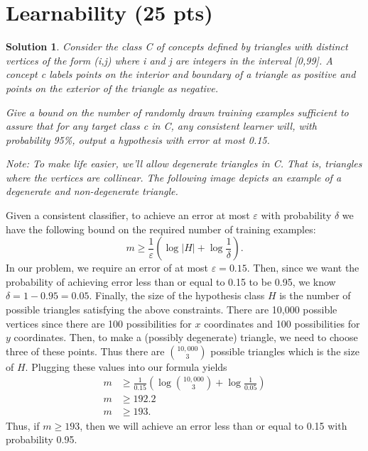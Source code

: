 \documentclass[12pt]{article}
\renewcommand{\epsilon}{\varepsilon}
\theoremstyle{definition}
\newtheorem*{solution*}{Solution}
\begin{document}
	\section{Learnability (25 pts)}
	\begin{solution*}
		\textit{Consider the class C of concepts defined by triangles with distinct vertices of the form (i,j) where
			i and j are integers in the interval [0,99]. A concept c labels points on the interior and boundary
			of a triangle as positive and points on the exterior of the triangle as negative.}
			
			\textit{Give a bound on the number of randomly drawn training examples sufficient to assure that for
			any target class c in C, any consistent learner will, with probability 95\%, output a hypothesis with
			error at most 0.15.}
			
			\textit{Note: To make life easier, we’ll allow degenerate triangles in C. That is, triangles where the
			vertices are collinear. The following image depicts an example of a degenerate and non-degenerate
			triangle.}
		
			Given a consistent classifier, to achieve an error at most $\epsilon$ with probability $\delta$ we have the following bound on the required number of training examples:
			\[m \geq \frac{1}{\epsilon}\left(\log |H| + \log\frac{1}{\delta}\right).\]
			In our problem, we require an error of at most $\epsilon = 0.15$. Then, since we want the probability of achieving error less than or equal to 0.15 to be 0.95, we know $\delta = 1-0.95 = 0.05$. Finally, the size of the hypothesis class $H$ is the number of possible triangles satisfying the above constraints. There are 10,000 possible vertices since there are 100 possibilities for $x$ coordinates and 100 possibilities for $y$ coordinates. Then, to make a (possibly degenerate) triangle, we need to choose three of these points. Thus there are $10,000 \choose 3$ possible triangles which is the size of $H$. Plugging these values into our formula yields
			\begin{align*}
			m &\geq \frac{1}{0.15}\left(\log {10,000 \choose 3} + \log \frac{1}{0.05}\right) \\
			m &\geq 192.2 \\
			m &\geq 193.
			\end{align*}
			Thus, if $m \geq 193$, then we will achieve an error less than or equal to 0.15 with probability 0.95. 
	\end{solution*}
\end{document}
